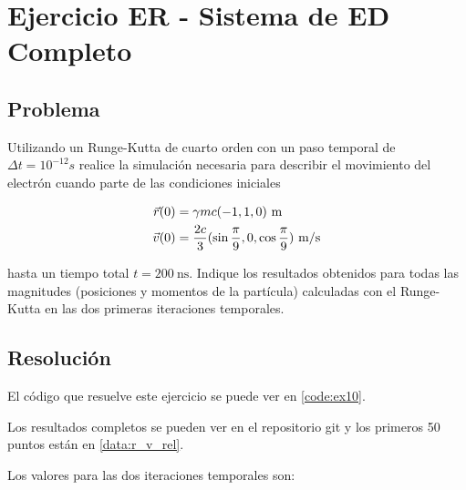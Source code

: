 \section{Ejercicio ER - Sistema de ED Completo}

\subsection{Problema}

Utilizando un Runge-Kutta de cuarto orden con un paso temporal de $\Delta t = 10^{-12} s$ realice la simulación necesaria para describir el movimiento del electrón cuando parte de las condiciones iniciales

\begin{align*}
	\vec{r}(0) &= \gamma m c  (-1, 1, 0 )\ \text{m} \\
	\vec{v}(0) &= \frac{2c}{3} 
		(
			\sin \frac{\pi}{9},
			0,
			\cos \frac{\pi}{9} 
		) \ \text{m\slash s}
\end{align*} 

hasta un tiempo total $t = 200\ \text{ns}$. Indique los resultados obtenidos para todas las magnitudes (posiciones y momentos de la partícula) calculadas con el Runge-Kutta en las dos primeras iteraciones temporales.

\subsection{Resolución} 

El código que resuelve este ejercicio se puede ver en \ref{code:ex10}.

Los resultados completos se pueden ver en el repositorio git y los primeros 50 puntos están en \ref{data:r_v_rel}. 

Los valores para las dos iteraciones temporales son:

\begin{table}[H]
	\centering
\end{table}

\begin{table}[H]
	\centering
\end{table}


